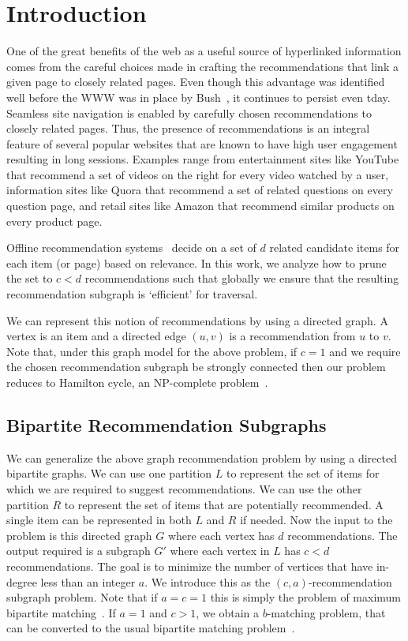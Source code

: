 
\section{Introduction}

One of the great benefits of the web as a useful source of hyperlinked
information comes from the careful choices made in crafting the recommendations
that link a given page to closely related pages. Even though this advantage was
identified well before the WWW was in place by Bush~\cite{Bush45}, it continues
to persist even tday. Seamless site navigation is enabled by carefully chosen
recommendations to closely related pages. Thus, the presence of recommendations
is an integral feature of several popular websites that are known to have high
user engagement resulting in long sessions. Examples range from 
entertainment sites like YouTube that recommend a set of videos on the right
for every video watched by a user, information sites like Quora that recommend
a set of related questions on every question page, and retail sites like Amazon
that recommend similar products on every product page. \vs

Offline recommendation systems~\cite{Schafer1999, Adomavicius2005, Resnick1997}
decide on a set of $d$ related candidate items for each item (or page) based 
on relevance. In this work, 
we analyze how to prune the set to $c < d$ recommendations 
such that globally we ensure that the resulting recommendation subgraph is 
`efficient' for traversal.\vs

We can represent this notion of recommendations by using a directed graph. A
vertex is an item and a directed edge $(u, v)$ is a recommendation from
$u$ to $v$. Note that, under this graph model for the above problem, if $c=1$ and we
require the chosen recommendation subgraph be strongly connected then our
problem reduces to Hamilton cycle, an NP-complete problem~\cite{CLRS2001}. \vs

\subsection{Bipartite Recommendation Subgraphs}

We can generalize the above graph recommendation problem by using a
directed bipartite graphs. We can use one partition $L$ to represent
the set of items for which we are required to suggest
recommendations. We can use the other partition $R$ to represent the
set of items that are potentially recommended. A single item
can be represented in both $L$ and $R$ if needed.  Now the input to
the problem is this directed graph $G$ where each vertex has $d$
recommendations. The output required is a subgraph $G'$ where each
vertex in $L$ has $c < d$ recommendations. The goal is to
minimize the number of vertices that have in-degree less than an
integer $a$. We introduce this as the $(c, a)$-recommendation subgraph
problem.  Note that if $a=c=1$ this is simply the problem of maximum
bipartite matching~\cite{LovaszPlummer1986}. If $a=1$ and $c > 1$,
we obtain a $b$-matching problem, that can be converted to the
usual bipartite matching problem~\cite{Gabow1983}.\vs

